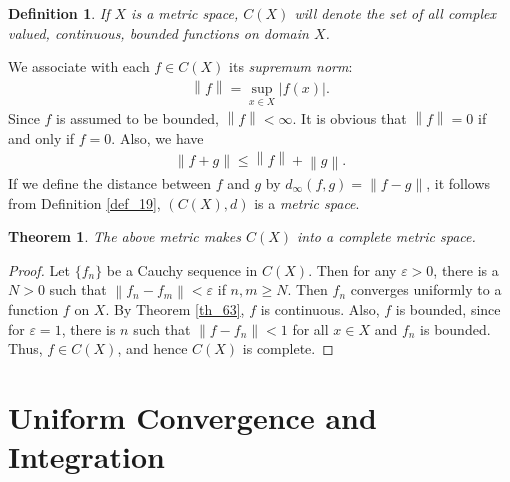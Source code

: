 \documentclass[11pt]{book}
\newtheorem{definition}{Definition}[chapter]
\newtheorem{theorem}{Theorem}[chapter]
\theoremstyle{definition}
\numberwithin{equation}{chapter}
\begin{document}
\medskip

\begin{definition}
If $X$ is a metric space, $C(X)$ will denote the set of all complex valued, continuous, bounded functions on domain $X$.
\end{definition}

\medskip

We associate with each $f \in C(X)$ its {\em supremum norm}:
\begin{align*}
    \left\|f\right\| = \sup_{x \in X} \left|f(x)\right|.
\end{align*}
Since $f$ is assumed to be bounded, $\left\|f\right\| < \infty$. It is obvious that $\left\|f\right\| = 0$ if and only if $f = 0$. Also, we have
\begin{align*}
    \left\|f + g\right\| \leq \left\|f\right\| + \left\|g\right\|.
\end{align*}
If we define the distance between $f$ and $g$ by $d_\infty(f,g) = \left\|f - g\right\|$, it follows from Definition \ref{def_19}, $(C(X),d)$ is a {\em metric space}.

\medskip

\begin{theorem}
The above metric makes $C(X)$ into a complete metric space.
\end{theorem}
\begin{proof}
Let $\{f_n\}$ be a Cauchy sequence in $C(X)$. Then for any $\varepsilon > 0$, there is a $N > 0$ such that $\left\|f_n - f_m\right\| < \varepsilon$ if $n,m \geq N$. Then $f_n$ converges uniformly to a function $f$ on $X$. By Theorem \ref{th_63}, $f$ is continuous. Also, $f$ is bounded, since for $\varepsilon = 1$, there is $n$ such that $\left\|f - f_n\right\| < 1$ for all $x \in X$ and $f_n$ is bounded. Thus, $f \in C(X)$, and hence $C(X)$ is complete.
\end{proof}


\medskip




\section{Uniform Convergence and Integration}
\end{document}
